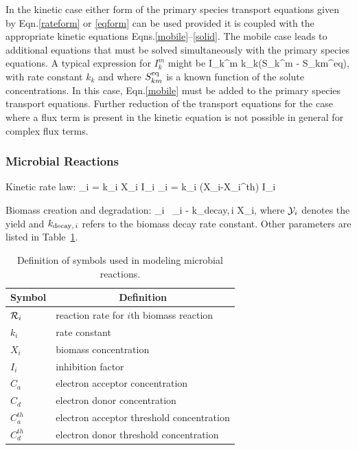 In the kinetic case either form of the primary species transport equations given by Eqn.\eqref{rateform} or \eqref{eqform} can be used provided it is coupled with the appropriate kinetic equations Eqns.\eqref{mobile}--\eqref{solid}. The mobile case leads to additional equations that must be solved simultaneously with the primary species equations. A typical expression for $I_k^m$ might be
\EQ
I_k^m \eq k_k\big(S_k^m - S_{km}^{\rm eq}\big),
\EN
with rate constant $k_k$ and where $S_{km}^{\rm eq}$ is a known function of the solute concentrations. In this case, Eqn.\eqref{mobile} must be added to the primary species transport equations. Further reduction of the transport equations for the case where a flux term is present in the kinetic equation is not possible in general for complex flux terms.

\subsubsection{Microbial Reactions}

Kinetic rate law:
\EQ
\R_i = k_i X_i   I_i
\EN
\EQ
\R_i = k_i (X_i-X_i^{th})   I_i
\EN

\noindent
Biomass creation and degradation:
\EQ
{} \eq \Y_i \, \R_i - k_{{\rm decay},\,i} X_i,
\EN
where ${\mathcal Y}_i$ denotes the yield and $k_{{\rm decay},\,i}$ refers to the biomass decay rate constant. Other parameters are listed in Table~\ref{tmicrobial}.

\begin{table}[h]\centering
\caption{Definition of symbols used in modeling microbial reactions.}
\label{tmicrobial}
\vspace{3mm}
\begin{tabular}{ll}
\toprule
Symbol &  \multicolumn{1}{c}{Definition}\\
\midrule
${{\mathcal R}}_i$ & reaction rate for $i$th biomass reaction\\
$k_i$ & rate constant\\
$X_i$ & biomass concentration\\
$I_i$ & inhibition factor\\
$C_a$ & electron acceptor concentration\\
$C_d$ & electron donor concentration\\
$C_a^{th}$ & electron acceptor threshold concentration\\
$C_d^{th}$ & electron donor threshold concentration\\
\bottomrule
\end{tabular}
\end{table}

